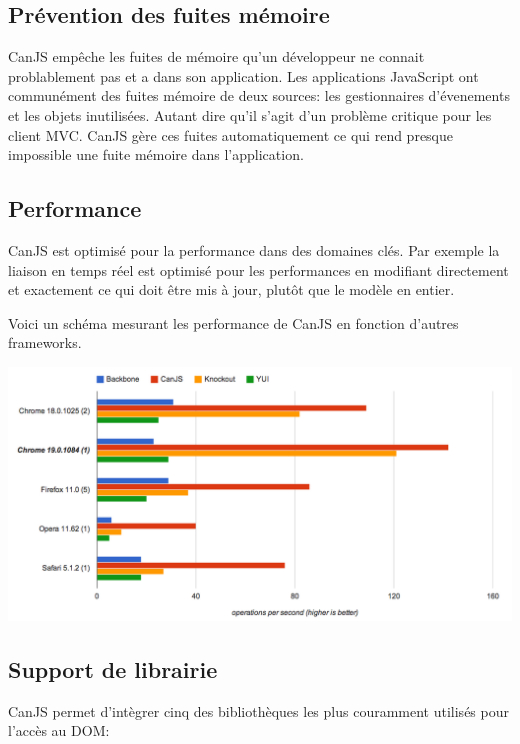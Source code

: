 \subsection{Prévention des fuites mémoire}

CanJS empêche les fuites de mémoire qu’un développeur ne connait problablement pas et a dans son application. Les applications JavaScript ont communément des fuites mémoire de deux sources: les gestionnaires d’évenements et les objets inutilisées.
Autant dire qu’il s’agit d’un problème critique pour les client MVC. CanJS gère ces fuites automatiquement ce qui rend presque impossible une fuite mémoire dans l’application.

\subsection{Performance}

CanJS est optimisé pour la performance dans des domaines clés.
Par exemple la liaison en temps réel est optimisé pour les performances en modifiant directement et exactement ce qui doit être mis à jour, plutôt que le modèle en entier.

Voici un schéma mesurant les performance de CanJS en fonction d’autres frameworks.


\begin{center}
\includegraphics[scale=0.4]{img/performance_livebind.png}
\label{Graphique performance CanJS}
\end{center}

\subsection{Support de librairie}

CanJS permet d'intègrer cinq des bibliothèques les plus couramment utilisés pour l’accès au DOM:

